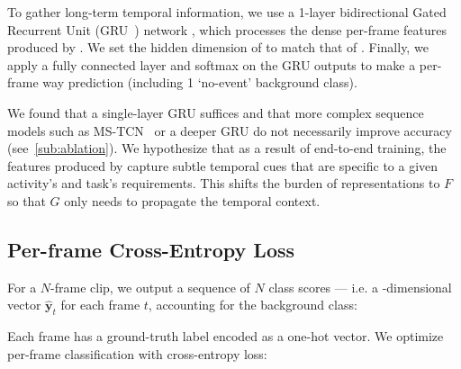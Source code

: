 \documentclass[runningheads]{llncs}
\newcommand{\notation}[1]{\ensuremath{#1}\xspace}
\newcommand{\NumFrames}{\notation{N}}
\newcommand{\Time}{\notation{t}}
\newcommand{\Prediction}[1]{\notation{\hat{\mathbf{y}}_{#1}}}
\newcommand{\FeatureExtractor}{\notation{F}}
\newcommand{\TemporalArchitecture}{\notation{G}}
\begin{document}
To gather long-term temporal information, we use a 1-layer bidirectional Gated
Recurrent Unit (GRU~\cite{gatedrnn}) network , which
processes the dense per-frame features produced by .
We set the hidden dimension of  to match that of .
Finally, we apply a fully connected layer and softmax on the GRU outputs to make a per-frame  way prediction (including 1 `no-event' background class).

We found that a single-layer GRU suffices and that more complex sequence models
such as MS-TCN~\cite{mstcn} or a deeper GRU do not necessarily improve accuracy
(see~\autoref{sub:ablation}).
We hypothesize that as a result of end-to-end training,
the features produced by  capture subtle temporal cues
that are specific to a given activity's and task's requirements.
This shifts the burden of representations to \FeatureExtractor so
that \TemporalArchitecture only needs to propagate the temporal context.

\subsection{Per-frame Cross-Entropy Loss}
\label{sub:losses}

For a \NumFrames-frame clip, we output a sequence of \NumFrames class scores ---
i.e. a -dimensional vector \Prediction{\Time} for each frame \Time, accounting for the background class:

Each frame has a ground-truth label  encoded as a one-hot vector.
We optimize per-frame classification with cross-entropy loss:
\end{document}
